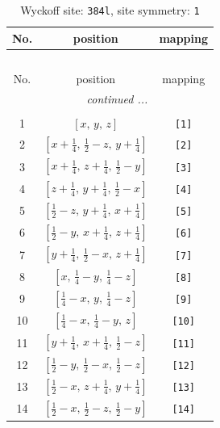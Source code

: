 \documentclass[fleqn,8pt]{jsarticle}
\begin{document}
\renewcommand{\arraystretch}{1.2}
\begin{longtable}{ccc}
\caption{Wyckoff site: {\tt 384l}, site symmetry: {\tt 1}}
 \\
 \hline \hline
No. & position & mapping \\ \hline \endfirsthead

\multicolumn{2}{l}{\tablename\ \thetable{}} \\
 \hline \hline
No. & position & mapping \\ \hline \endhead

 \hline \hline
\multicolumn{2}{r}{\footnotesize\it continued ...} \\ \endfoot

 \hline \hline
\multicolumn{2}{r}{} \\ \endlastfoot

1 & $\left[ x,\, y,\, z \right]$ & {\tt [1]} \\ \hline
2 & $\left[ x + \frac{1}{4},\, \frac{1}{2} - z,\, y + \frac{1}{4} \right]$ & {\tt [2]} \\ \hline
3 & $\left[ x + \frac{1}{4},\, z + \frac{1}{4},\, \frac{1}{2} - y \right]$ & {\tt [3]} \\ \hline
4 & $\left[ z + \frac{1}{4},\, y + \frac{1}{4},\, \frac{1}{2} - x \right]$ & {\tt [4]} \\ \hline
5 & $\left[ \frac{1}{2} - z,\, y + \frac{1}{4},\, x + \frac{1}{4} \right]$ & {\tt [5]} \\ \hline
6 & $\left[ \frac{1}{2} - y,\, x + \frac{1}{4},\, z + \frac{1}{4} \right]$ & {\tt [6]} \\ \hline
7 & $\left[ y + \frac{1}{4},\, \frac{1}{2} - x,\, z + \frac{1}{4} \right]$ & {\tt [7]} \\ \hline
8 & $\left[ x,\, \frac{1}{4} - y,\, \frac{1}{4} - z \right]$ & {\tt [8]} \\ \hline
9 & $\left[ \frac{1}{4} - x,\, y,\, \frac{1}{4} - z \right]$ & {\tt [9]} \\ \hline
10 & $\left[ \frac{1}{4} - x,\, \frac{1}{4} - y,\, z \right]$ & {\tt [10]} \\ \hline
11 & $\left[ y + \frac{1}{4},\, x + \frac{1}{4},\, \frac{1}{2} - z \right]$ & {\tt [11]} \\ \hline
12 & $\left[ \frac{1}{2} - y,\, \frac{1}{2} - x,\, \frac{1}{2} - z \right]$ & {\tt [12]} \\ \hline
13 & $\left[ \frac{1}{2} - x,\, z + \frac{1}{4},\, y + \frac{1}{4} \right]$ & {\tt [13]} \\ \hline
14 & $\left[ \frac{1}{2} - x,\, \frac{1}{2} - z,\, \frac{1}{2} - y \right]$ & {\tt [14]} \\ \hline

\end{longtable}
\end{document}
